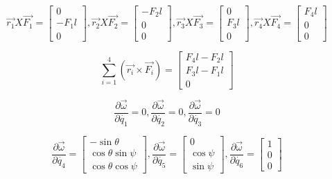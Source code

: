 \documentclass{article}
\begin{document}
\begin{equation}
\overrightarrow{r_1} X \overrightarrow{F_1} = \left[\begin{array}{c} 0 \\ -F_1 l \\ 0 \end{array}\right],
\overrightarrow{r_2} X \overrightarrow{F_2} = \left[\begin{array}{c} -F_2 l \\ 0 \\ 0 \end{array}\right],
\overrightarrow{r_3} X \overrightarrow{F_3} = \left[\begin{array}{c} 0 \\ F_3 l \\ 0 \end{array}\right],
\overrightarrow{r_4} X \overrightarrow{F_4} = \left[\begin{array}{c} F_4 l \\ 0 \\ 0 \end{array}\right]
\end{equation}

\begin{equation}
\sum_{i=1}^{4}(\overrightarrow{r_{i}}\times\overrightarrow{F_{i}}) =
\left[\begin{array}{c} F_4 l -F_2 l \\ F_3 l - F_1 l \\ 0\end{array}\right]
\end{equation}

\begin{equation}
\frac{\partial\overrightarrow{\omega}}{\partial\dot{q_{1}}} = 0, \frac{\partial\overrightarrow{\omega}}{\partial\dot{q_{2}}} = 0, \frac{\partial\overrightarrow{\omega}}{\partial\dot{q_{3}}} = 0 
\end{equation}

\begin{equation}
\frac{\partial\overrightarrow{\omega}}{\partial\dot{q_{4}}} = \left[\begin{array}{c} -\sin{\theta} \\ \cos{\theta}\sin{\psi} \\ \cos{\theta}\cos{\psi} \end{array}\right],
\frac{\partial\overrightarrow{\omega}}{\partial\dot{q_{5}}} = \left[\begin{array}{c} 0 \\ \cos{\psi} \\ \sin{\psi} \end{array}\right],
\frac{\partial\overrightarrow{\omega}}{\partial\dot{q_{6}}} = \left[\begin{array}{c} 1 \\ 0 \\ 0\end{array}\right]
\end{equation}
\end{document}
